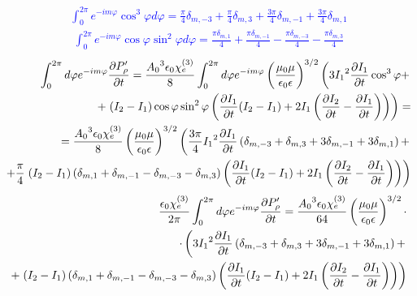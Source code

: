 \textcolor{blue} { \begin{equation*} \begin{aligned}
\int_0^{2\pi} e^{-i m \varphi} \cos^3 \varphi d \varphi = 
\frac{\pi}{4} \delta_{m,-3} + \frac{\pi}{4} \delta_{m,3} + 
\frac{3 \pi}{4} \delta_{m,-1} + \frac{3 \pi}{4} \delta_{m,1}
\end{aligned} \end{equation*} }
%
\textcolor{blue} { \begin{equation*} \begin{aligned}
\int_0^{2\pi} e^{-i m \varphi} \cos \varphi \sin^2 \varphi d \varphi = 
\frac{\pi \delta_{m,1} }{4} + \frac{\pi \delta_{m,-1} }{4} - 
\frac{\pi \delta_{m,-3} }{4} - \frac{\pi \delta_{m,3} }{4}
\end{aligned} \end{equation*} }
%
\textcolor{blue} { \begin{equation*} \begin{aligned}
\int_{0}^{2 \pi} d \varphi e^{-im \varphi} \frac{\partial P_\rho^\prime}{\partial t} = 
\frac{ {A_0}^3 \epsilon_0 \chi_e^{(3)} }{ 8 } \int_{0}^{2\pi} d \varphi
e^{-im\varphi} \left( \frac{\mu_0 \mu} {\epsilon_0 \epsilon} \right)^{3/2} 
\left( 3 {I_1}^2 \frac{\partial I_1}{\partial t} \cos^3 \varphi + \right. \\
+ \left. ( I_2 - I_1 ) \cos \varphi \sin^2 \varphi \left( 
\frac{\partial I_1}{\partial t} ( I_2 - I_1 ) + 2 I_1 \left( \frac{\partial I_2}{\partial t} - 
\frac{\partial I_1}{\partial t} \right) \right) \right) = \\
= \frac{ {A_0}^3 \epsilon_0 \chi_e^{(3)} }{ 8 } 
\left( \frac{\mu_0 \mu} {\epsilon_0 \epsilon} \right)^{3/2}
\left( \frac{3 \pi}{4} {I_1}^2 \frac{\partial I_1}{\partial t} \left( \delta_{m,-3} + 
\delta_{m,3} + 3 \delta_{m,-1} + 3 \delta_{m,1} \right) + \right. \\
+ \frac{\pi }{4} \left. ( I_2 - I_1 ) \left( \delta_{m,1} + 
\delta_{m,-1} - \delta_{m,-3} - \delta_{m,3} \right) \left( 
\frac{\partial I_1}{\partial t} ( I_2 - I_1 ) + 2 I_1 \left( \frac{\partial I_2}{\partial t} - 
\frac{\partial I_1}{\partial t} \right) \right) \right)
\end{aligned} \end{equation*} }
%
\begin{equation*} \begin{aligned}
\frac{\epsilon_0 \chi_e^{(3)}}{2 \pi} \int_{0}^{2\pi} d \varphi 
e^{-im \varphi} \frac{\partial P_\rho^\prime}{\partial t} = 
\frac{ {A_0}^3 \epsilon_0 \chi_e^{(3)}}{ 64 } 
\left( \frac{\mu_0 \mu} {\epsilon_0 \epsilon} \right)^{3/2} \cdot \\ 
\cdot \left( 3 {I_1}^2 \frac{\partial I_1}{\partial t} \left( \delta_{m,-3} + 
\delta_{m,3} + 3 \delta_{m,-1} + 3 \delta_{m,1} \right) + \right. \\
+ \left. ( I_2 - I_1 ) \left( \delta_{m,1} + \delta_{m,-1} - 
\delta_{m,-3} - \delta_{m,3} \right) \left( 
\frac{\partial I_1}{\partial t} ( I_2 - I_1 ) + 2 I_1 \left( \frac{\partial I_2}{\partial t} - 
\frac{\partial I_1}{\partial t} \right) \right) \right)
\end{aligned} \end{equation*}
